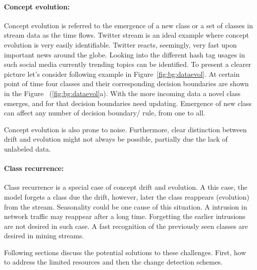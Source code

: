 \paragraph{Concept evolution:}
Concept evolution is referred to the emergence of a new class or a set of classes in stream data as the time flows. Twitter stream is an ideal example where concept evolution is very easily identifiable. Twitter reacts, seemingly, very fast upon important news around the globe. Looking into the different hash tag usages in such social media currently trending topics can be identified. To present a clearer picture let's consider following example in Figure~\ref{fig:bg:dataevol}. At certain point of time four classes and their corresponding decision boundaries are shown in the Figure~ (\ref{fig:bg:dataevol}a). With the more incoming data a novel class emerges, and for that decision boundaries need updating. Emergence of new class can affect any number of decision boundary/ rule, from one to all.

Concept evolution is also prone to noise. Furthermore, clear distinction between drift and evolution might not always be possible, partially due the lack of unlabeled data.

\paragraph{Class recurrence:}
Class recurrence is a special case of concept drift and evolution. A this case, the model forgets a class due the drift, however, later the class reappears (evolution) from the stream. Seasonality could be one cause of this situation. A intrusion in network traffic may reappear after a long time. Forgetting the earlier intrusions are not desired in such case. A fast recognition of the previously seen classes are desired in mining streams.

Following sections discuss the potential solutions to these challenges. First, how to address the limited resources and then the change detection schemes.

